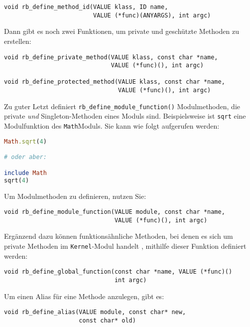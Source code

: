 \begin{lstlisting}
void rb_define_method_id(VALUE klass, ID name, 
                         VALUE (*func)(ANYARGS), int argc)
\end{lstlisting}

Dann gibt es noch zwei Funktionen, um private und geschützte Methoden
zu erstellen:

\begin{lstlisting}
void rb_define_private_method(VALUE klass, const char *name, 
                              VALUE (*func)(), int argc)

void rb_define_protected_method(VALUE klass, const char *name, 
                                VALUE (*func)(), int argc)
\end{lstlisting}

Zu guter Letzt definiert \verb+rb_define_module_function()+
Modulmethoden, die private \emph{und} Singleton-Methoden eines Moduls
sind. Beispielsweise ist \verb+sqrt+ eine Modulfunktion des
\verb+Math+\-Mo\-duls. Sie kann wie folgt aufgerufen werden:

\begin{lstlisting}[language=ruby]
Math.sqrt(4)

# oder aber:

include Math
sqrt(4)
\end{lstlisting}

\noindent Um Modulmethoden zu definieren, nutzen Sie:

\begin{lstlisting}
void rb_define_module_function(VALUE module, const char *name,
                               VALUE (*func)(), int argc)
\end{lstlisting}

Ergänzend dazu können funktionsähnliche Methoden, bei denen es sich um
private Methoden im \verb+Kernel+-Modul handelt ,
mithilfe dieser Funktion definiert werden:

\begin{lstlisting}
void rb_define_global_function(const char *name, VALUE (*func)()
                               int argc)
\end{lstlisting}

Um einen Alias für eine Methode anzulegen, gibt es:

\begin{lstlisting}
void rb_define_alias(VALUE module, const char* new,
                     const char* old)
\end{lstlisting}

